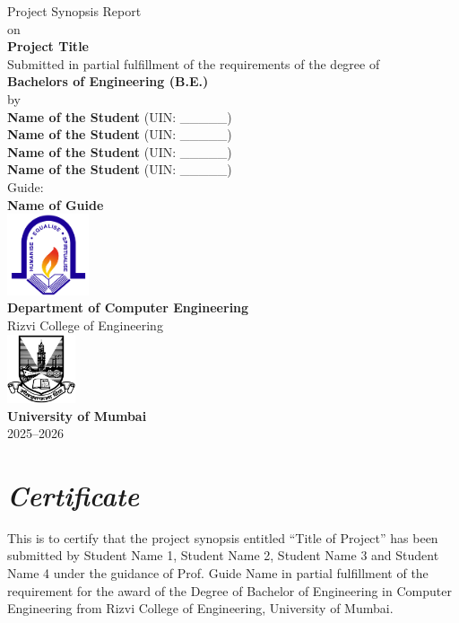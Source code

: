 \documentclass[12pt,a4paper,twoside,openright]{report}
\begin{document}
	
	\begin{titlepage}
		\centering
		\vspace*{0.2cm}
		\Large  {Project Synopsis Report} \\[0.1cm]
		\large on \\[0.1cm]
		\Huge \textbf{Project Title} \\[0.5cm]
		\large  {Submitted in partial fulfillment of the requirements of the degree of} \\[0.5cm]
		\Large \textbf{Bachelors of Engineering (B.E.)} \\[0.5cm]
		\large by \\[0.5cm]
		\large \textbf{Name of the Student } (UIN: \_\_\_\_\_) \\
		\large \textbf{Name of the Student } (UIN: \_\_\_\_\_) \\
		\large \textbf{Name of the Student } (UIN: \_\_\_\_\_) \\
		\large \textbf{Name of the Student } (UIN: \_\_\_\_\_) \\ [1cm]
		 
		
		\large {Guide:} \\ 
		\large \textbf{Name of Guide} \\[1cm]
		
		\includegraphics[width=0.18\textwidth]{images/rcoe-logo.png}\\
		\Large \textbf{ Department of Computer Engineering} \\
		{\LARGE Rizvi College of Engineering} \\[1cm]
		
		\includegraphics[width=0.15\textwidth]{images/mu-logo.png}\\
		\LARGE \textbf{University of Mumbai} \\
		2025--2026 \\
	\end{titlepage}
	
	\chapter*{\centering \textit {Certificate}}
	This is to certify that the project synopsis entitled “Title of Project” has been submitted by Student Name 1, Student Name 2, Student Name 3 and Student Name 4 under the guidance of Prof. Guide Name in partial fulfillment of the requirement for the award of the Degree of Bachelor of Engineering in Computer Engineering from Rizvi College of Engineering, University of Mumbai.
	
\end{document}

